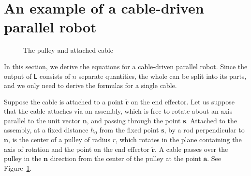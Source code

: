 \documentclass[reqno,12pt]{amsart}
\begin{document}
\section{An example of a cable-driven parallel robot}

\begin{figure}


\caption{The pulley and attached cable}
\label{pulley}
\end{figure}

In this section, we derive the equations for a cable-driven parallel robot.  Since the output of $\mathsf L$ consists of $n$ separate quantities, the whole can be split into its parts, and we only need to derive the formulas for a single cable.

Suppose the cable is attached to a point $\tilde{\bm r}$ on the end effector.  Let us suppose that the cable attaches via an assembly, which is free to rotate about an axis parallel to the unit vector $\bm n$, and passing through the point $\bm s$.  Attached to the assembly, at a fixed distance $h_0$ from the fixed point $\bm s$, by a rod perpendicular to $\bm n$, is the center of a pulley of radius $r$, which rotates in the plane containing the axis of rotation and the point on the end effector $\tilde{\bm r}$.  A cable passes over the pulley in the $\bm n$ direction from the center of the pulley at the point $\bm a$.  See Figure~\ref{pulley}.
\end{document}
